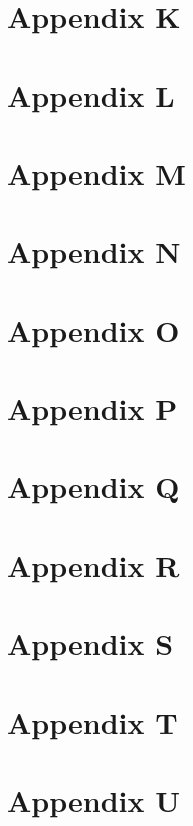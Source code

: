 \chapter{Appendix K}

\chapter{Appendix L}

\chapter{Appendix M}

\chapter{Appendix N}

\chapter{Appendix O}

\chapter{Appendix P}

\chapter{Appendix Q}

\chapter{Appendix R}

\chapter{Appendix S}

\chapter{Appendix T}

\chapter{Appendix U}

